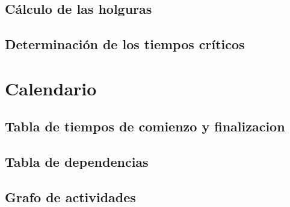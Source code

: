 \documentclass[11pt,a4paper,spanish,twoside]{report}
\begin{document}
\section{Cálculo de las holguras}
\section{Determinación de los tiempos críticos}

\chapter{Calendario}

\section{Tabla de tiempos de comienzo y finalizacion}
\section{Tabla de dependencias}
\section{Grafo de actividades}


 

\end{document}

